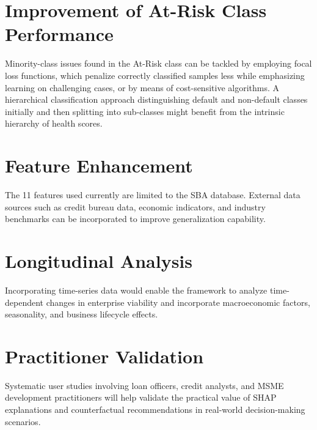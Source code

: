 \documentclass[12pt,a4paper]{report}
\begin{document}
\section{Improvement of At-Risk Class Performance}
Minority-class issues found in the At-Risk class can be tackled by employing focal loss functions, which penalize correctly classified samples less while emphasizing learning on challenging cases, or by means of cost-sensitive algorithms. A hierarchical classification approach distinguishing default and non-default classes initially and then splitting into sub-classes might benefit from the intrinsic hierarchy of health scores.

\section{Feature Enhancement}
The 11 features used currently are limited to the SBA database. External data sources such as credit bureau data, economic indicators, and industry benchmarks can be incorporated to improve generalization capability.

\section{Longitudinal Analysis}
Incorporating time-series data would enable the framework to analyze time-dependent changes in enterprise viability and incorporate macroeconomic factors, seasonality, and business lifecycle effects.

\section{Practitioner Validation}
Systematic user studies involving loan officers, credit analysts, and MSME development practitioners will help validate the practical value of SHAP explanations and counterfactual recommendations in real-world decision-making scenarios.
\end{document}
